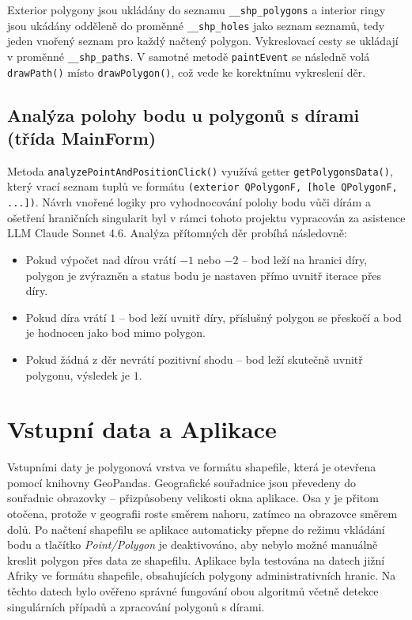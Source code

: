 \documentclass[11pt, a4paper]{article}
\begin{document}
Exterior polygony jsou ukládány do seznamu \texttt{\_\_shp\_polygons} a interior ringy jsou ukádány odděleně do proměnné \texttt{\_\_shp\_holes} jako seznam seznamů, tedy jeden vnořený seznam pro každý načtený polygon. Vykreslovací cesty se ukládají v proměnné \texttt{\_\_shp\_paths}. V samotné metodě \texttt{paintEvent} se následně volá \texttt{drawPath()} místo \texttt{drawPolygon()}, což vede ke korektnímu vykreslení děr.

\subsection{Analýza polohy bodu u polygonů s dírami (třída MainForm)}
Metoda \texttt{analyzePointAndPositionClick()} využívá getter \texttt{getPolygonsData()}, který vrací seznam tuplů ve formátu \texttt{(exterior QPolygonF, [hole QPolygonF, ...])}. Návrh vnořené logiky pro vyhodnocování polohy bodu vůči dírám a ošetření hraničních singularit byl v rámci tohoto projektu vypracován za asistence LLM Claude Sonnet 4.6. Analýza přítomných děr probíhá následovně:

\begin{itemize} 
\item Pokud výpočet nad dírou vrátí $-1$ nebo $-2$ -- bod leží na hranici díry, polygon je zvýrazněn a status bodu je nastaven přímo uvnitř iterace přes díry. \item Pokud díra vrátí $1$ -- bod leží uvnitř díry, příslušný polygon se přeskočí a bod je hodnocen jako bod mimo polygon. 
\item Pokud žádná z děr nevrátí pozitivní shodu -- bod leží skutečně uvnitř polygonu, výsledek je $1$. 
\end{itemize}

\section{Vstupní data a Aplikace}
Vstupními daty je polygonová vrstva ve formátu shapefile, která je otevřena pomocí knihovny GeoPandas. Geografické souřadnice jsou převedeny do souřadnic obrazovky -- přizpůsobeny velikosti okna aplikace. Osa y je přitom otočena, protože v geografii roste směrem nahoru, zatímco na obrazovce směrem dolů. Po načtení shapefilu se aplikace automaticky přepne do režimu vkládání bodu a tlačítko \textit{Point/Polygon} je deaktivováno, aby nebylo možné manuálně kreslit polygon přes data ze shapefilu. Aplikace byla testována na datech jižní Afriky ve formátu shapefile, obsahujících polygony administrativních hranic. Na těchto datech bylo ověřeno správné fungování obou algoritmů včetně detekce singulárních případů a zpracování polygonů s dírami.
\end{document}
